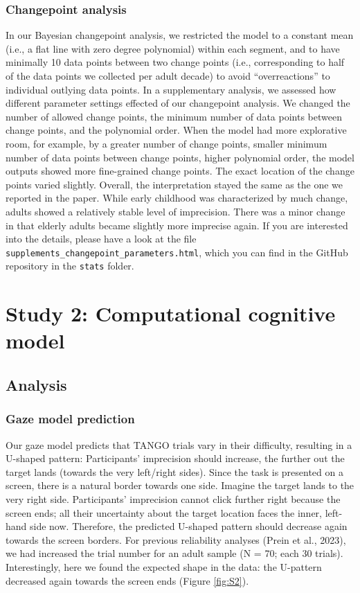 \documentclass[
  man,floatsintext]{apa7}
\begin{document}
\subsubsection{Changepoint analysis}\label{changepoint-analysis}

In our Bayesian changepoint analysis, we restricted the model to a constant mean (i.e., a flat line with zero degree polynomial) within each segment, and to have minimally 10 data points between two change points (i.e., corresponding to half of the data points we collected per adult decade) to avoid ``overreactions'' to individual outlying data points. In a supplementary analysis, we assessed how different parameter settings effected of our changepoint analysis. We changed the number of allowed change points, the minimum number of data points between change points, and the polynomial order. When the model had more explorative room, for example, by a greater number of change points, smaller minimum number of data points between change points, higher polynomial order, the model outputs showed more fine-grained change points. The exact location of the change points varied slightly. Overall, the interpretation stayed the same as the one we reported in the paper. While early childhood was characterized by much change, adults showed a relatively stable level of imprecision. There was a minor change in that elderly adults became slightly more imprecise again. If you are interested into the details, please have a look at the file \texttt{supplements\_changepoint\_parameters.html}, which you can find in the GitHub repository in the \texttt{stats} folder.

\section{Study 2: Computational cognitive model}\label{study-2-computational-cognitive-model}

\subsection{Analysis}\label{analysis-1}

\subsubsection{Gaze model prediction}\label{gaze-model-prediction}

Our gaze model predicts that TANGO trials vary in their difficulty, resulting in a U-shaped pattern: Participants' imprecision should increase, the further out the target lands (towards the very left/right sides). Since the task is presented on a screen, there is a natural border towards one side. Imagine the target lands to the very right side. Participants' imprecision cannot click further right because the screen ends; all their uncertainty about the target location faces the inner, left-hand side now. Therefore, the predicted U-shaped pattern should decrease again towards the screen borders. For previous reliability analyses (Prein et al., 2023), we had increased the trial number for an adult sample (N = 70; each 30 trials). Interestingly, here we found the expected shape in the data: the U-pattern decreased again towards the screen ends (Figure \ref{fig:S2}).
\end{document}

